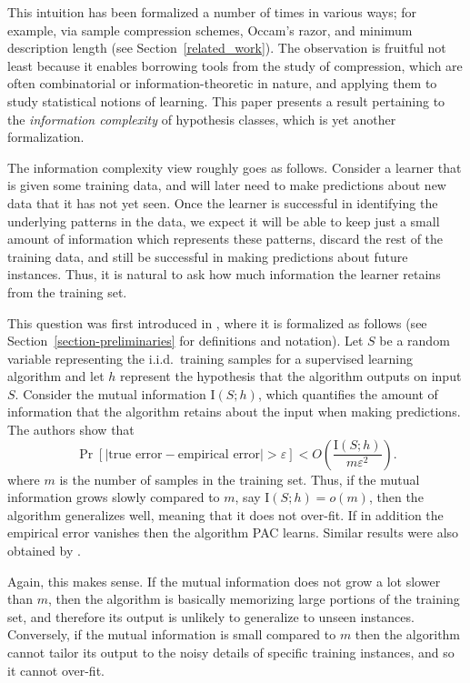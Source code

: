 \documentclass[final,12pt]{colt2018}
\newcommand{\mc}[1]{\mathcal{#1}}
\newcommand{\cH}{\mc{H}}
\newcommand{\II}[1]{\mathrm{I}\left(#1\right)}
\begin{document}
This intuition has been formalized a number of times in various ways;
for example, via sample compression schemes, Occam's razor, and minimum description length
(see Section~\ref{related_work}). The observation is fruitful not least because it enables borrowing tools from the study of compression, which are often combinatorial or information-theoretic in nature, and applying them to study statistical notions of learning. This paper presents a result pertaining to the {\em information complexity} of hypothesis classes, which is yet another formalization. 

The information complexity view roughly goes as follows. Consider a learner that is given some training data, and will later need to make predictions about new data that it has not yet seen. Once the learner is successful in identifying the underlying patterns in the data, we expect it will be able to keep just a small amount of information which represents these patterns, discard the rest of the training data, and still be successful in making predictions about future instances. Thus, it is natural to ask how much information the learner retains from the training set. 


This question was first introduced in \cite{bassily2018learners}, where it is formalized as follows (see Section~\ref{section-preliminaries} for definitions and notation). Let %
$S$ be a random variable representing the i.i.d.\ training samples for a supervised learning algorithm %
and let $h$ %
represent the hypothesis that the algorithm outputs on input $S$. Consider the mutual information $\II{S;h}$, which quantifies the amount of information that the algorithm retains about the input when making predictions. The authors show that
\[
\Pr \left[ \left|\text{true error} - \text{empirical error}\right| > \varepsilon \right] 
< O\left(\frac{\II{S;h}}{m\varepsilon^2}\right) .
\]
where $m$ is the number of samples in the training set. Thus, if the mutual information grows slowly compared to $m$, say $\II{S;h} = o(m)$, then the algorithm generalizes well, meaning that it does not over-fit. If in addition the empirical error vanishes then the algorithm PAC learns. Similar results were also obtained by \cite{xu2017information}.

Again, this makes sense. If the mutual information does not grow a lot slower than $m$, then the algorithm is basically memorizing large portions of the training set, and therefore its output is unlikely to generalize to unseen instances.  Conversely, if the mutual information is small compared to $m$ then the algorithm cannot tailor its output to the noisy details of specific training instances, and so it cannot over-fit.
\end{document}
